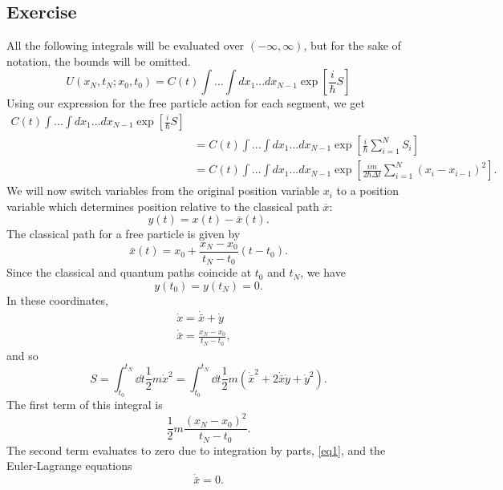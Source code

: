 \subsection{Exercise}
All the following integrals will be evaluated over $(-\infty,\infty)$, but for the sake of notation, the bounds will be omitted. 
\begin{equation}
    U(x_N,t_N;x_0,t_0)=C(t)\int ...\int dx_1...dx_{N-1} \exp[\frac i \hbar S]
\end{equation}
Using our expression for the free particle action for each segment, we get
\begin{align}
    C(t)\int ...\int dx_1...dx_{N-1} \exp[\frac i \hbar S]\\&=C(t)\int ...\int dx_1...dx_{N-1} \exp[\frac i \hbar \sum_{i=1}^NS_i]\\ &\label{eq3}=C(t)\int ...\int dx_1...dx_{N-1} \exp[\frac{im}{2\hbar\Delta t}\sum_{i=1}^N(x_i-x_{i-1})^2].
\end{align}
We will now switch variables from the original position variable $x_i$ to a position variable which determines position relative to the classical path $\bar x$:
\begin{equation}
    y(t)=x(t)-\bar x(t).
\end{equation} 
The classical path for a free particle is given by
\begin{equation}
    \bar x(t)=x_0+\frac{x_N-x_0}{t_N-t_0}(t-t_0).
\end{equation}
Since the classical and quantum paths coincide at $t_0$ and $t_N$, we have 
\begin{equation}
\label{eq1}
    y(t_0)=y(t_N)=0.
\end{equation}
In these coordinates, 
\begin{align}
    \dot x=\dot{\bar x}+\dot y &\\
    \dot{\bar x}=\frac{x_N-x_0}{t_N-t_0},
\end{align}
and so
\begin{equation}
    S=\int_{t_0}^{t_N}\dd t\frac 1 2 m\dot x^2=\int_{t_0}^{t_N}\dd t\frac 1 2 m(\dot{\bar x}^2+2\dot{\bar x}\dot y+\dot y^2).
\end{equation}
The first term of this integral is 
\begin{equation}
    \frac 1 2 m \frac{(x_N-x_0)^2}{t_N-t_0}.
\end{equation}
The second term evaluates to zero due to integration by parts, \eqref{eq1}, and the Euler-Lagrange equations
\begin{equation}
    \ddot{\bar x}=0.
\end{equation}
